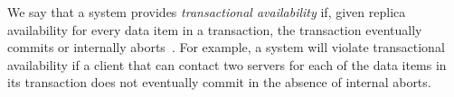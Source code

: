We say that a system provides \textit{transactional availability} if,
given replica availability for every data item in a transaction, the
transaction eventually commits or internally
aborts~\cite{hat-hotos}. For example, a system will violate
transactional availability if a client that can contact two
servers for each of the data items in its transaction does not
eventually commit in the absence of internal aborts.

